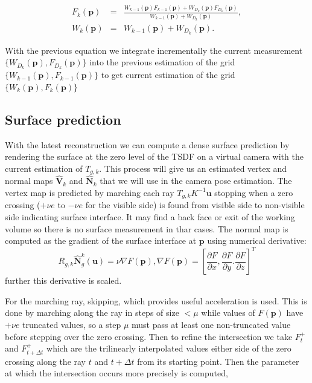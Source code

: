 \begin{eqnarray*}
 F_k(\mathbf{p}) &=& \frac{W_{k-1}(\mathbf{p}) F_{k-1}(\mathbf{p}) + W_{D_{k}}(\mathbf{p}) F_{D_{k}}(\mathbf{p}) }{ W_{k-1}(\mathbf{p}) + W_{D_{k}}(\mathbf{p}) }, \\
 W_k(\mathbf{p}) &=& W_{k-1}(\mathbf{p}) + W_{D_{k}}(\mathbf{p}).
\end{eqnarray*}

With the previous equation we integrate incrementally the current measurement $\{ W_{D_{k}}(\mathbf{p}), F_{D_{k}}(\mathbf{p}) \}$ into the previous estimation of the grid $\{W_{k-1}(\mathbf{p}), F_{k-1}(\mathbf{p})\}$ to get current estimation of the grid $\{W_{k}(\mathbf{p}), F_{k}(\mathbf{p})\}$

\subsection{Surface prediction}
With the latest reconstruction we can compute a dense surface prediction by rendering the surface at the zero level of the TSDF on a virtual camera with the current estimation of $T_{g,k}$. This process will give us an estimated vertex and normal maps $\hat{\mathbf{V}}_k$ and $\hat{\mathbf{N}}_k$ that we will use in the camera pose estimation.
The vertex map is predicted by marching each ray $T_{g,k}K^{-1}\mathbf{u}$ stopping when a zero crossing ($+\nu e$ to $-\nu e$ for the visible side) is found from visible side to non-visible side indicating surface interface.
It may find a back face or exit of the working volume so there is no surface measurement in thar cases.
The normal map is computed as the gradient of the surface interface at $\mathbf{p}$ using numerical derivative:
\begin{equation}
 R_{g,k} \hat{\mathbf{N}}_g^k(\mathbf{u}) = \nu \nabla F(\mathbf{p}), \nabla F(\mathbf{p}) = \left [ \frac{\partial F}{\partial x}, \frac{\partial F}{\partial y}. \frac{\partial F}{\partial z} \right ]^T
\end{equation}
further this derivative is scaled.

For the marching ray, skipping, which provides useful acceleration is used. This is done by marching along the ray in steps of size $< \mu$ while values of $F(\mathbf{p})$ have $+ \nu e$ truncated values, so a step $\mu$ must pass at least one non-truncated value before stepping over the zero crossing.
Then to refine the intersection we take $F^+_t$ and $F^+_{t+\Delta t}$ which are the trilinearly interpolated values either side of the zero crossing along the ray $t$ and $t+\Delta t$ from its starting point.
Then the parameter at which the intersection occurs more precisely is computed,

